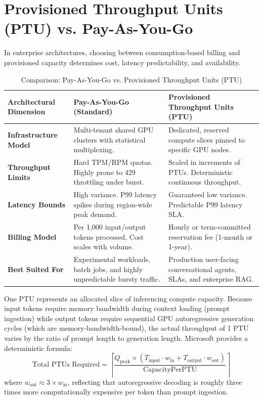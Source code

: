 \section{Provisioned Throughput Units (PTU) vs. Pay-As-You-Go}

In enterprise architectures, choosing between consumption-based billing and provisioned capacity determines cost, latency predictability, and availability.

\begin{table}[htbp]
\centering\small
\begin{tabular}{lp{6.2cm}p{6.2cm}}
\toprule
\textbf{Architectural Dimension} & \textbf{Pay-As-You-Go (Standard)} & \textbf{Provisioned Throughput Units (PTU)} \\
\midrule
\textbf{Infrastructure Model} & Multi-tenant shared GPU clusters with statistical multiplexing. & Dedicated, reserved compute slices pinned to specific GPU nodes. \\
\textbf{Throughput Limits} & Hard TPM/RPM quotas. Highly prone to 429 throttling under burst. & Scaled in increments of PTUs. Deterministic continuous throughput. \\
\textbf{Latency Bounds} & High variance. P99 latency spikes during region-wide peak demand. & Guaranteed low variance. Predictable P99 latency SLA. \\
\textbf{Billing Model} & Per 1,000 input/output tokens processed. Cost scales with volume. & Hourly or term-committed reservation fee (1-month or 1-year). \\
\textbf{Best Suited For} & Experimental workloads, batch jobs, and highly unpredictable bursty traffic. & Production user-facing conversational agents, SLAs, and enterprise RAG. \\
\bottomrule
\end{tabular}
\caption{Comparison: Pay-As-You-Go vs. Provisioned Throughput Units (PTU)}
\label{tab:ptu-vs-paygo}
\end{table}

\begin{underthehoodbox}
One PTU represents an allocated slice of inferencing compute capacity. Because input tokens require memory bandwidth during context loading (prompt ingestion) while output tokens require sequential GPU autoregressive generation cycles (which are memory-bandwidth-bound), the actual throughput of 1 PTU varies by the ratio of prompt length to generation length. Microsoft provides a deterministic formula:
\begin{equation}
\text{Total PTUs Required} = \left\lceil \frac{Q_{\text{peak}} \times \left( T_{\text{input}} \cdot w_{\text{in}} + T_{\text{output}} \cdot w_{\text{out}} \right)}{\text{CapacityPerPTU}} \right\rceil
\end{equation}
where $w_{\text{out}} \approx 3 \times w_{\text{in}}$, reflecting that autoregressive decoding is roughly three times more computationally expensive per token than prompt ingestion.
\end{underthehoodbox}

